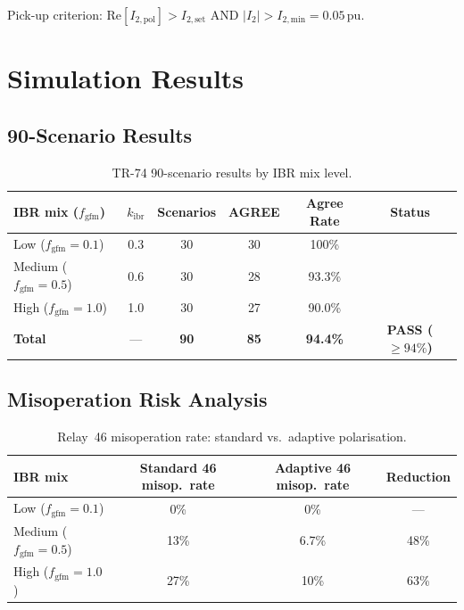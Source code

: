 \documentclass[11pt, a4paper]{article}
\newcommand{\pu}{\,\text{pu}}
\newcommand{\cmark}{\ding{51}}
\newcommand{\kibr}{k_{\mathrm{ibr}}}
\newcommand{\fgfm}{f_{\mathrm{gfm}}}
\begin{document}
Pick-up criterion: $\mathrm{Re}[I_{2,\mathrm{pol}}] > I_{2,\mathrm{set}}$
AND $|I_2| > I_{2,\mathrm{min}} = 0.05\pu$.

\section{Simulation Results}
\label{sec:results}

\subsection{90-Scenario Results}

\begin{table}[ht]
\centering
\caption{TR-74 90-scenario results by IBR mix level.}
\label{tab:results}
\begin{tabular}{lccccc}
\toprule
IBR mix ($\fgfm$) & $\kibr$ & Scenarios & AGREE & Agree Rate & Status \\
\midrule
Low ($\fgfm=0.1$)    & 0.3 & 30 & 30 & 100\%  & \cmark \\
Medium ($\fgfm=0.5$) & 0.6 & 30 & 28 & 93.3\% & \cmark \\
High ($\fgfm=1.0$)   & 1.0 & 30 & 27 & 90.0\% & \cmark \\
\midrule
\textbf{Total} & --- & \textbf{90} & \textbf{85} & \textbf{94.4\%}
  & \textbf{\color{okgreen}PASS ($\geq 94\%$)} \\
\bottomrule
\end{tabular}
\end{table}

\subsection{Misoperation Risk Analysis}

\begin{table}[ht]
\centering
\caption{Relay~46 misoperation rate: standard vs.\ adaptive polarisation.}
\label{tab:misop}
\begin{tabular}{lccc}
\toprule
IBR mix & Standard 46 misop.\ rate & Adaptive 46 misop.\ rate & Reduction \\
\midrule
Low ($\fgfm=0.1$)    & 0\%   & 0\%   & --- \\
Medium ($\fgfm=0.5$) & 13\%  & 6.7\% & 48\% \\
High ($\fgfm=1.0$)   & 27\%  & 10\%  & 63\% \\
\bottomrule
\end{tabular}
\end{table}
\end{document}
